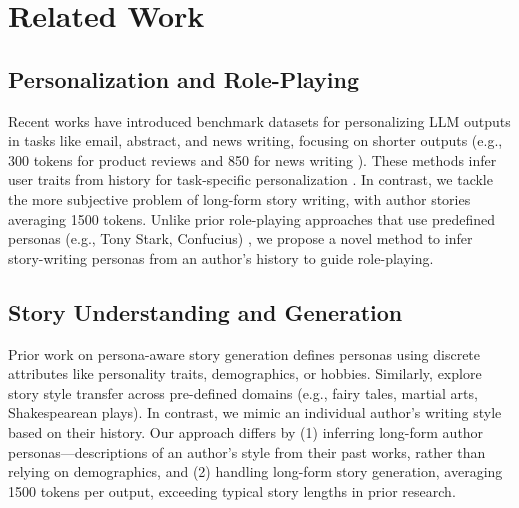 \section{Related Work}

\subsection{Personalization and Role-Playing}
Recent works have introduced benchmark datasets for personalizing LLM outputs in tasks like email, abstract, and news writing, focusing on shorter outputs (e.g., 300 tokens for product reviews \citep{kumar2024longlamp} and 850 for news writing \citep{shashidhar-etal-2024-unsupervised}). These methods infer user traits from history for task-specific personalization \citep{sun-etal-2024-revealing, sun-etal-2025-persona, pal2024beyond, li2023teach, salemi2025reasoning}. In contrast, we tackle the more subjective problem of long-form story writing, with author stories averaging 1500 tokens. Unlike prior role-playing approaches that use predefined personas (e.g., Tony Stark, Confucius) \citep{wang-etal-2024-rolellm, sadeq-etal-2024-mitigating, tu2023characterchat, xu2023expertprompting}, we propose a novel method to infer story-writing personas from an author’s history to guide role-playing.


\subsection{Story Understanding and Generation}  
Prior work on persona-aware story generation \citep{yunusov-etal-2024-mirrorstories, bae-kim-2024-collective, zhang-etal-2022-persona, chandu-etal-2019-way} defines personas using discrete attributes like personality traits, demographics, or hobbies. Similarly, \citep{zhu-etal-2023-storytrans} explore story style transfer across pre-defined domains (e.g., fairy tales, martial arts, Shakespearean plays). In contrast, we mimic an individual author's writing style based on their history. Our approach differs by (1) inferring long-form author personas—descriptions of an author’s style from their past works, rather than relying on demographics, and (2) handling long-form story generation, averaging 1500 tokens per output, exceeding typical story lengths in prior research.